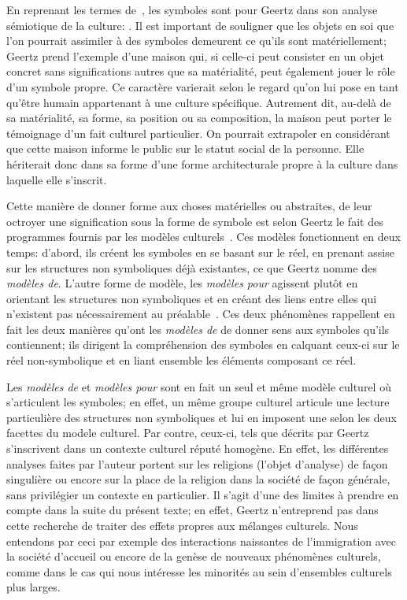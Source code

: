 En reprenant les termes de~\citet{Langer1962}, les symboles sont pour Geertz dans son analyse sémiotique de la culture: .
Il est important de souligner que les objets en soi que l'on pourrait assimiler à des symboles demeurent ce qu'ils sont matériellement; Geertz prend l'exemple d'une maison qui, si celle-ci peut consister en un objet concret sans significations autres que sa matérialité, peut également jouer le rôle d'un symbole propre.
Ce caractère varierait selon le regard qu'on lui pose en tant qu'être humain appartenant à une culture spécifique.
Autrement dit, au-delà de sa matérialité, sa forme, sa position ou sa composition, la maison peut porter le témoignage d'un fait culturel particulier.
On pourrait extrapoler en considérant que cette maison informe le public sur le statut social de la personne.
Elle hériterait donc dans sa forme d'une forme architecturale propre à la culture dans laquelle elle s'inscrit.

Cette manière de donner forme aux choses matérielles ou abstraites, de leur octroyer une signification sous la forme de symbole est selon Geertz le fait des programmes fournis par les modèles culturels~\citep[25]{Geertz1972}.
Ces modèles fonctionnent en deux temps: d'abord, ils créent les symboles en se basant sur le réel, en prenant assise sur les structures non symboliques déjà existantes, ce que Geertz nomme des \emph{modèles de}.
L'autre forme de modèle, les \emph{modèles pour} agissent plutôt en orientant les structures non symboliques et en créant des liens entre elles qui n'existent pas nécessairement au préalable~\citep[26--27]{Geertz1972}.
Ces deux phénomènes rappellent en fait les deux manières qu'ont les \emph{modèles de} de donner sens aux symboles qu'ils contiennent; ils dirigent la compréhension des symboles en calquant ceux-ci sur le réel non-symbolique et en liant ensemble les éléments composant ce réel.

Les \emph{modèles de} et \emph{modèles pour} sont en fait un seul et même modèle culturel où s'articulent les symboles; en effet, un même groupe culturel articule une lecture particulière des structures non symboliques et lui en imposent une selon les deux facettes du modele culturel.
Par contre, ceux-ci, tels que décrits par Geertz s'inscrivent dans un contexte culturel réputé homogène.
En effet, les différentes analyses faites par l'auteur portent sur les religions  (l'objet d'analyse) de façon singulière ou encore sur la place de la religion dans la société de façon générale, sans privilégier un contexte en particulier.
Il s'agit d'une des limites à prendre en compte dans la suite du présent texte; en effet, Geertz n'entreprend pas dans cette recherche de traiter des effets propres aux mélanges culturels.
Nous entendons par ceci par exemple des interactions naissantes de l'immigration avec la société d'accueil ou encore de la genèse de nouveaux phénomènes culturels, comme dans le cas qui nous intéresse les minorités \lgbt{} au sein d'ensembles culturels plus larges.

